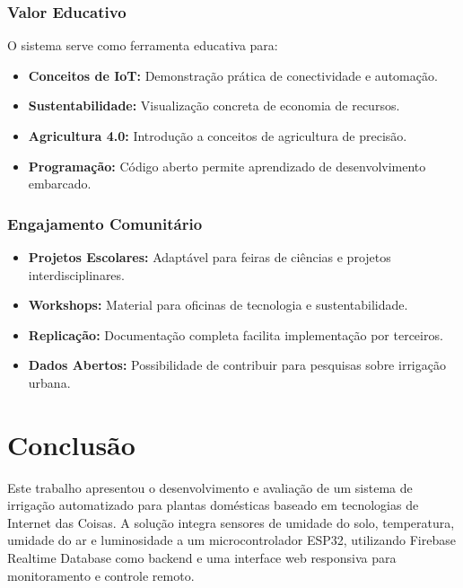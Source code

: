 \documentclass[twoside,english,brazilian]{UNISINOSmonografia}
\begin{document}
\subsection{Valor Educativo}
O sistema serve como ferramenta educativa para:
\begin{itemize}
    \item \textbf{Conceitos de IoT:} Demonstração prática de conectividade e automação.
    \item \textbf{Sustentabilidade:} Visualização concreta de economia de recursos.
    \item \textbf{Agricultura 4.0:} Introdução a conceitos de agricultura de precisão.
    \item \textbf{Programação:} Código aberto permite aprendizado de desenvolvimento embarcado.
\end{itemize}

\subsection{Engajamento Comunitário}
\begin{itemize}
    \item \textbf{Projetos Escolares:} Adaptável para feiras de ciências e projetos interdisciplinares.
    \item \textbf{Workshops:} Material para oficinas de tecnologia e sustentabilidade.
    \item \textbf{Replicação:} Documentação completa facilita implementação por terceiros.
    \item \textbf{Dados Abertos:} Possibilidade de contribuir para pesquisas sobre irrigação urbana.
\end{itemize}

\chapter{Conclusão}

Este trabalho apresentou o desenvolvimento e avaliação de um sistema de irrigação automatizado para plantas domésticas baseado em tecnologias de Internet das Coisas. A solução integra sensores de umidade do solo, temperatura, umidade do ar e luminosidade a um microcontrolador ESP32, utilizando Firebase Realtime Database como backend e uma interface web responsiva para monitoramento e controle remoto.
\end{document}
